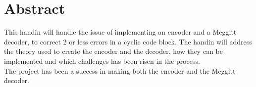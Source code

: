 \documentclass[Main]{subfiles}
\begin{document}
\section{Abstract}

This handin will handle the issue of implementing an encoder and a Meggitt decoder, to correct 2 or less errors in a cyclic code block.
The handin will address the theory used to create the encoder and the decoder, how they can be implemented and which challenges has been risen in the process.
\\
The project has been a success in making both the encoder and the Meggitt decoder.
\end{document}
